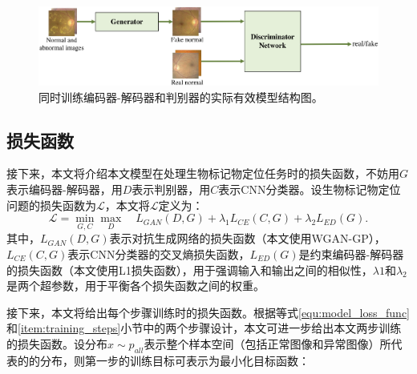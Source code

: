 \begin{figure}[h]
	\centering
	\includegraphics[width=1.0\textwidth]{figure/u_d_architecture.png}
	\caption{同时训练编码器-解码器和判别器的实际有效模型结构图。}
	\label{fig:u_d_architecture}
\end{figure}
\subsection{损失函数}\label{subsec:loss_func}
接下来，本文将介绍本文模型在处理生物标记物定位任务时的损失函数，不妨用$G$表示编码器-解码器，用$D$表示判别器，用$C$表示CNN分类器。设生物标记物定位问题的损失函数为$\mathcal{L}$，本文将$\mathcal{L}$定义为：
\begin{equation}\label{equ:model_loss_func}
\mathcal{L}=\min _{G, C} \max _{D} \quad L_{GAN}(D, G)+\lambda_{1} L_{C E}(C, G)+\lambda_{2} L_{E D}(G).
\end{equation}
其中，$L_{GAN}(D, G)$表示对抗生成网络的损失函数（本文使用WGAN-GP），$L_{CE}(C, G)$表示CNN分类器的交叉熵损失函数，$L_{E D}(G)$是约束编码器-解码器的损失函数（本文使用L1损失函数），用于强调输入和输出之间的相似性，$\lambda{1}$和$\lambda_{2}$是两个超参数，用于平衡各个损失函数之间的权重。

接下来，本文将给出每个步骤训练时的损失函数。根据等式\ref{equ:model_loss_func}和\ref{item:training_steps}小节中的两个步骤设计，本文可进一步给出本文两步训练的损失函数。设分布$x\sim p_{all}$表示整个样本空间（包括正常图像和异常图像）所代表的的分布，则第一步的训练目标可表示为最小化目标函数：

